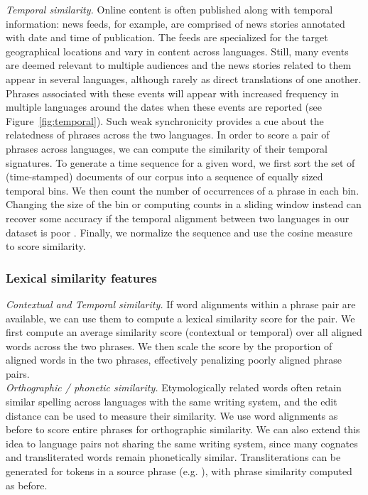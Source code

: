 \documentclass[11pt]{article}
\newcommand{\mnote}[1]{\marginpar{%
  \vskip-\baselineskip
  \raggedright\footnotesize
  \itshape\hrule\smallskip\tiny{#1}\par\smallskip\hrule}}
\newcommand{\mtodo}[1]{\mnote{\textcolor{red}{#1}}}
\newcommand{\figref}[1]{Figure~\ref{#1}}
\begin{document}
\noindent\emph{Temporal similarity.} Online content is often published along with temporal information: news feeds, for example, are comprised of news stories annotated with date and time of publication.  The feeds are specialized for the target geographical locations and vary in content across languages.  Still, many events are deemed relevant to multiple audiences and the news stories related to them appear in several languages, although rarely as direct translations of one another.  Phrases associated with these events will appear with increased frequency in multiple languages around the dates when these events are reported (see \figref{fig:temporal}).  Such weak synchronicity provides a cue about the relatedness of phrases across the two languages.  In order to score a pair of phrases across languages, we can compute the similarity of their temporal signatures. To generate a time sequence for a given word, we first sort the set of (time-stamped) documents of our corpus into a sequence of equally sized temporal bins.  We then count the number of occurrences of a phrase in each bin.  Changing the size of the bin or computing counts in a sliding window instead can recover some accuracy if the temporal alignment between two languages in our dataset is poor \cite{Klementiev:2006b}.  Finally, we normalize the sequence and use the cosine measure to score similarity. 

\subsubsection{Lexical similarity features}  \label{sect:lexfeats}

\noindent\emph{Contextual and Temporal similarity.}  If word alignments within a phrase pair are available, we can use them to compute a lexical similarity score for the pair.  We first compute an average similarity score (contextual or temporal) over all aligned words across the two phrases.  We then scale the score by the proportion of aligned words in the two phrases, effectively penalizing poorly aligned phrase pairs.\mtodo{Mention that it is the average of both forward and backward alignments?}\\

\noindent\emph{Orthographic / phonetic similarity.} Etymologically related words often retain similar spelling across languages with the same writing system, and the edit distance can be used to measure their similarity.  We use word alignments as before to score entire phrases for orthographic similarity.\mtodo{Not done quite the same as above but will glance over it.} We can also extend this idea to language pairs not sharing the same writing system, since many cognates and transliterated words remain phonetically similar.  Transliterations can be generated for tokens in a source phrase (e.g. \cite{Virga:2003,Irvine:2010a}), with phrase similarity computed as before.\\
\end{document}
